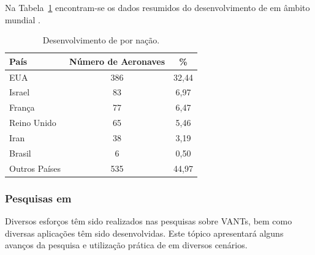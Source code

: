 Na Tabela~\ref{tbl:country} encontram-se os dados resumidos do desenvolvimento de \vants em âmbito mundial \cite{Bryner2007}.

\begin{table}[h!]
\centering
	\begin{tabular}{| l | c | c |}
		\hline
		País & Número de Aeronaves & \% \\
		\hline
		EUA & 386 & 32,44 \\
		Israel & 83 & 6,97 \\
		França & 77 & 6,47 \\
		Reino Unido & 65 & 5,46 \\
		Iran & 38 & 3,19 \\
		Brasil & 6 & 0,50\\
		Outros Países & 535 & 44,97 \\
		\hline
	\end{tabular}

	\caption{Desenvolvimento de \vants por nação.}
	\label{tbl:country}
\end{table}


\subsubsection{Pesquisas em \vants}
Diversos esforços têm sido realizados nas pesquisas sobre VANTs, bem como diversas aplicações têm sido desenvolvidas. Este tópico apresentará alguns avanços da pesquisa e
utilização prática de \vants em diversos cenários.

